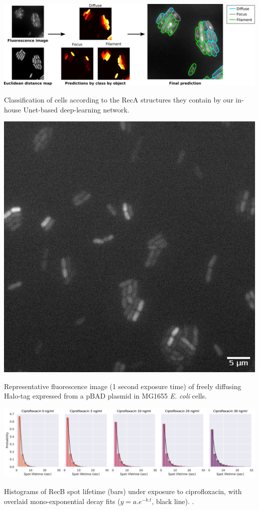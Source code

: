 
\begin{suppfigure*}[htbp]
    \begin{center}
    \includegraphics[width=\textwidth]{SI_Figures/ObjectClassifier.pdf}
    \end{center}
    \caption{Classification of cells according to the RecA structures they contain by our in-house Unet-based deep-learning network.}
    \label{SIFig:object_class}
\end{suppfigure*}

\begin{suppfigure*}[htbp]
\begin{center}
\includegraphics[width=.5\linewidth]{SI_Figures/Free_Halo_image.png}
\end{center}
\caption{Representative fluorescence image (1 second exposure time) of freely diffusing Halo-tag expressed from a pBAD plasmid in MG1655 \textit{E. coli} cells.}
\label{SIFig:freehalo_image}
\end{suppfigure*}

\begin{suppfigure*}[htbp]
\begin{center}
\includegraphics[width=\linewidth]{SI_Figures/Monoexp_fits_cipro.pdf}
\end{center}
\caption{Histograms of RecB spot lifetime (bars) under exposure to ciprofloxacin, with overlaid mono-exponential decay fits ($y=a.e^{-k.t}$, black line). . }
\label{SIFig:monoexp_fits}
\end{suppfigure*}

